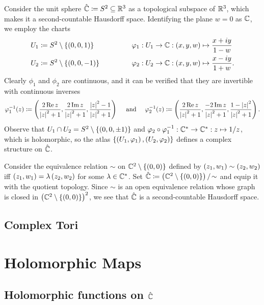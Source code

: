 \begin{example}
    Consider the unit sphere $\hat{\mathbb{C}}\coloneqq S^2\subseteq\mathbb{R}^3$ as a topological subspace of $\mathbb{R}^3$, which makes it a second-countable Hausdorff space. Identifying the plane $w=0$ as $\mathbb{C}$, we employ the charts
    \begin{equation*}
        \begin{alignedat}{2}
            U_1&\coloneqq S^2\comp\l\{\l(0,0,1\r)\r\}\ \ \ \ \ \ \ \ \ \ \ \ \ \ \ \ &&\phi_1:U_1\to\C:\tpl{x,y,w}\mapsto\frac{x+iy}{1-w} \\
            U_2&\coloneqq S^2\comp\l\{\l(0,0,-1\r)\r\}&&\phi_2:U_2\to\C:\tpl{x,y,w}\mapsto\frac{x-iy}{1+w}.
        \end{alignedat}
    \end{equation*}
    Clearly $\phi_1$ and $\phi_2$ are continuous, and it can be verified that they are invertible with continuous inverses
    \begin{equation*}
        \phi_1^{-1}\!\l(z\r)\coloneqq\tpl{\frac{2\Re z}{\l|z\r|^2+1},\frac{2\Im z}{\l|z\r|^2+1},\frac{\l|z\r|^2-1}{\l|z\r|^2+1}}\ \ \ \ \textrm{and}\ \ \ \ \phi_2^{-1}\!\l(z\r)\coloneqq\tpl{\frac{2\Re z}{\l|z\r|^2+1},\frac{-2\Im z}{\l|z\r|^2+1},\frac{1-\l|z\r|^2}{\l|z\r|^2+1}}.
    \end{equation*}
    Observe that $U_1\cap U_2=S^2\setminus\left\{\left(0,0,\pm1\right)\right\}$ and $\varphi_2\circ\varphi_1^{-1}:\mathbb{C}^\ast\to\mathbb{C}^\ast:z\mapsto1/z$, which is holomorphic, so the atlas $\left\{\left(U_1,\varphi_1\right),\left(U_2,\varphi_2\right)\right\}$ defines a complex structure on $\hat{\mathbb{C}}$.\exqed
\end{example}
\begin{example}
    Consider the equivalence relation $\sim$ on $\mathbb{C}^2\setminus\left\{\left(0,0\right)\right\}$ defined by $\left(z_1,w_1\right)\sim\left(z_2,w_2\right)$ iff $\left(z_1,w_1\right)=\lambda\left(z_2,w_2\right)$ for some $\lambda\in\mathbb{C}^\ast$. Set $\hat{\mathbb{C}}\coloneqq\left(\mathbb{C}^2\setminus\left\{\left(0,0\right)\right\}\right)/\!\sim$ and equip it with the quotient topology. Since $\sim$ is an open equivalence relation whose graph is closed in $\left(\mathbb{C}^2\setminus\left\{\left(0,0\right)\right\}\right)^2$, we see that $\hat{\mathbb{C}}$ is a second-countable Hausdorff space. 
\end{example}
\subsection{Complex Tori}
\section{Holomorphic Maps}
\begin{definition}\label{1:def:holomorphic_maps}

\end{definition}
\subsection{Holomorphic functions on $\hat{\mathbb{C}}$}

